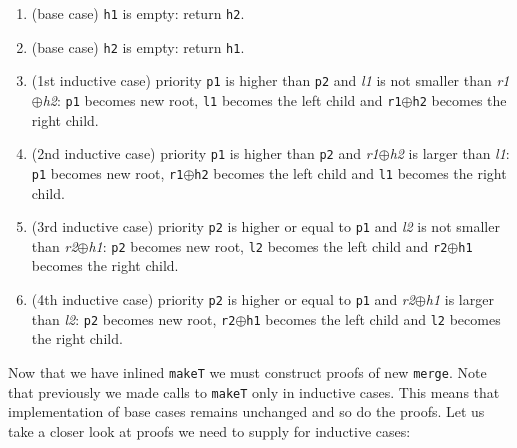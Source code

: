 \begin{enumerate}
 \item (base case) \texttt{h1} is empty: return \texttt{h2}.
 \item (base case) \texttt{h2} is empty: return \texttt{h1}.
 \item (1st inductive case) priority \texttt{p1} is higher than \texttt{p2} and \textit{l1} is not smaller than  \textit{r1}$\oplus$\textit{h2}: \texttt{p1} becomes new root, \texttt{l1} becomes the left child and \texttt{r1}$\oplus$\texttt{h2} becomes the right child.
 \item (2nd inductive case) priority \texttt{p1} is higher than \texttt{p2} and \textit{r1}$\oplus$\textit{h2} is larger than \textit{l1}: \texttt{p1} becomes new root, \texttt{r1}$\oplus$\texttt{h2} becomes the left child and \texttt{l1} becomes the right child.
 \item (3rd inductive case) priority \texttt{p2} is higher or equal to \texttt{p1} and \textit{l2} is not smaller than  \textit{r2}$\oplus$\textit{h1}: \texttt{p2} becomes new root, \texttt{l2} becomes the left child and \texttt{r2}$\oplus$\texttt{h1} becomes the right child.
 \item (4th inductive case) priority \texttt{p2} is higher or equal to \texttt{p1} and \textit{r2}$\oplus$\textit{h1} is larger than  \textit{l2}: \texttt{p2} becomes new root, \texttt{r2}$\oplus$\texttt{h1} becomes the left child and \texttt{l2} becomes the right child.
\end{enumerate}
\noindent
Now that we have inlined \texttt{makeT} we must construct proofs of new \texttt{merge}. Note that previously we made calls to \texttt{makeT} only in inductive cases. This means that implementation of base cases remains unchanged and so do the proofs. Let us take a closer look at proofs we need to supply for inductive cases:

